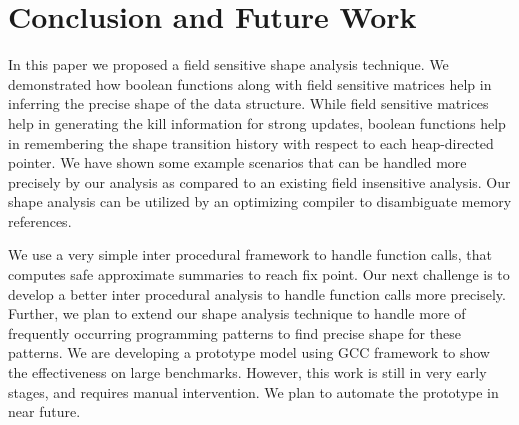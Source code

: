 \documentclass[letterpaper]{sig-alternate}
\begin{document}
\section{Conclusion and Future Work} \label{sec:concl}

In this paper we proposed a field sensitive shape analysis
technique. We demonstrated how boolean functions along with
field sensitive matrices help in inferring the precise shape
of the data structure. While field sensitive matrices help
in generating the kill information for strong updates,
boolean functions help in remembering the shape transition
history with respect to each heap-directed pointer. We have
shown some example scenarios that can be handled more
precisely by our analysis as compared to an existing field
insensitive analysis. Our shape analysis can be utilized by
an optimizing compiler to disambiguate memory references.

We use a very simple inter procedural framework to handle
function calls, that computes safe approximate summaries to
reach fix point. Our next challenge is to develop a better
inter procedural analysis to handle function calls more
precisely. Further, we plan to extend our shape analysis
technique to handle more of frequently occurring programming
patterns to find precise shape for these patterns. We are
developing a prototype model using GCC framework to show the
effectiveness on large benchmarks. However, this work is
still in very early stages, and requires manual
intervention. We plan to automate the prototype in near
future.


  
\end{document}
